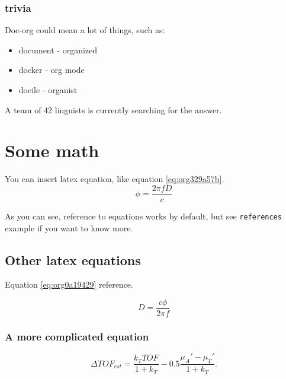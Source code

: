 \subsubsection{trivia}
\label{sec:org57b531f}
Doc-org could mean a lot of things, such as:
\begin{itemize}
\item document - organized
\item docker - org mode
\item docile - organist
\end{itemize}
A team of 42 linguists is currently searching for the answer.

\section{Some math}
\label{sec:org83daced}
You can insert latex equation, like equation \ref{eq:org329a57b}.
\begin{equation}
\label{eq:org329a57b}
\phi = \frac{2\pi fD}{c}
\end{equation}

As you can see, reference to equations works by default, but see \texttt{references}
example if you want to know more.

\subsection{Other latex equations}
\label{sec:org09591f2}
Equation \ref{eq:org0a19429} reference.

\begin{equation}
\label{eq:org0a19429}
D = \frac{c\phi}{2\pi f}
\end{equation}

\subsubsection{A more complicated equation}
\label{sec:orgfbde2b1}

\begin{equation}
\Delta TOF_{est} = \frac{k_T TOF}{1+k_T } - 0.5 \frac{\mu_A' - \mu_T'}{1+k_T}.
\end{equation}


